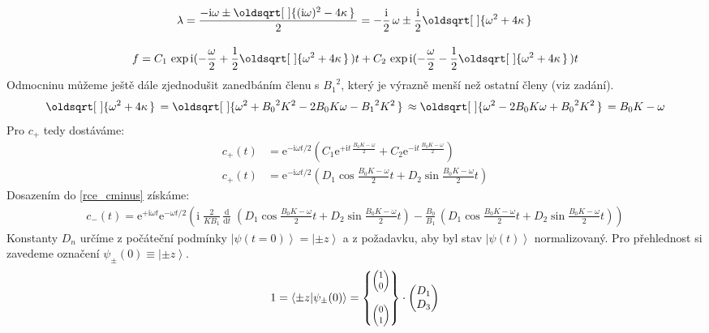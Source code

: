 \documentclass[10pt,a4paper]{article}
\renewcommand*{\sqrt}[2][\ ]{\oldsqrt[#1]{#2\,}\,}
\newcommand{\const}[1]{\text{#1}}
\newcommand{\mat}[1]{
    \begin{pmatrix}
        #1
    \end{pmatrix}
}
\newcommand{\smat}[2][1]{
    \scalebox{#1}{$\mat{#2}$}
}
\newcommand{\dd}[2]{\frac{\const{d} #1}{\const{d} #2} \;}
\newcommand{\ket}[1]{\left| #1 \right>}
\newcommand{\braket}[2]{\left< #1 \middle| #2 \right>}
\newcommand{\e}[1]{\const{e}^{#1}}
\renewcommand{\i}{\const{i}}
\begin{document}
\begin{gather*}
    \lambda
    = \frac{-\i \omega \pm \sqrt{(\i\omega)^2 - 4 \kappa}}{2}
    = - \frac{\i}{2} \, \omega \pm \frac{\i}{2} \sqrt{\omega^2 + 4\kappa}
    \\[10pt]
    f
    = C_1 \, \exp\i(-\frac{\omega}{2} + \frac{1}{2} \sqrt{\omega^2 + 4\kappa}) t
    + C_2 \, \exp\i(-\frac{\omega}{2} - \frac{1}{2} \sqrt{\omega^2 + 4\kappa}) t
\end{gather*}
Odmocninu můžeme ještě dále zjednodušit zanedbáním členu s ${B_1}^2$, který je výrazně menší než ostatní členy (viz zadání).
\begin{gather*}
    \sqrt{\omega^2 + 4\kappa}
    = \sqrt{
        \omega^2
        + {B_0}^2 K^2
        - 2 B_0 K \omega
        - {B_1}^2 K^2
    } \approx  \sqrt{
        \omega^2
        - 2 B_0 K \omega
        + {B_0}^2 K^2
    }
    = B_0 K - \omega
\end{gather*}
Pro $c_+$ tedy dostáváme:
\begin{align*}
    c_+(t) &= \e{-\i\omega t/2} \left(
        C_1 \e{+\i t\, \frac{B_0 K - \omega}{2}} +
        C_2 \e{-\i t\, \frac{B_0 K - \omega}{2}}
    \right)
    \\[10pt]
    c_+(t) &= \e{-\i\omega t/2} \left(
        D_1 \cos \frac{B_0 K - \omega}{2} t +
        D_2 \sin \frac{B_0 K - \omega}{2} t
    \right)
\end{align*}
Dosazením do \eqref{rce_cminus} získáme:
\begin{gather*}
    c_-(t) = \e{+\i \omega t} \e{-\omega t/2} \left(
        \i \; \frac{2}{K B_1} \, \dd{}{t} \left(
            D_1 \cos \tfrac{B_0 K - \omega}{2} t +
            D_2 \sin \tfrac{B_0 K - \omega}{2} t
        \right)
        - \frac{B_0}{B_1} \, \left(
            D_1 \cos \tfrac{B_0 K - \omega}{2} t +
            D_2 \sin \tfrac{B_0 K - \omega}{2} t
        \right)
    \right)
\end{gather*}
Konstanty $D_n$ určíme z počáteční podmínky $\ket{\psi(t=0)} = \ket{\pm z}$ a z požadavku, aby byl stav $\ket{\psi(t)}$ normalizovaný. Pro přehlednost si zavedeme označení $\psi_\pm(0) \equiv \ket{\pm z}$.
\begin{gather*}
    1 = \braket{\pm z}{\psi_\pm(0)}
    = \begin{Bmatrix}
        \smat[0.8]{1 \\ 0} \\[15pt]
        \smat[0.8]{0 \\ 1}
    \end{Bmatrix}
    \cdot \mat{
        D_1 \\ D_3
    }
\end{gather*}
\end{document}
